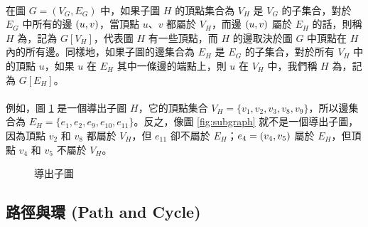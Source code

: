 \documentclass[12pt,a4paper,oneside]{report}
\begin{document}
\begin{CJK}{UTF8}{bkai}
\paragraph{}在圖 $G=(V_G, E_G)$ 中，如果子圖 $H$ 的頂點集合為 $V_H$ 是 $V_G$ 的子集合，對於 $E_G$ 中所有的邊 $({u},{v})$，當頂點 $u$、$v$ 都屬於 $V_H$，而邊 $({u},{v})$ 屬於 $E_H$ 的話，則稱 $H$ 為\textbf{}，記為 $G[V_H]$，代表圖 $H$ 有一些頂點，而 $H$ 的邊取決於圖 $G$ 中頂點在 $H$ 內的所有邊。同樣地，如果子圖的邊集合為 $E_H$ 是 $E_G$ 的子集合，對於所有 $V_H$ 中的頂點 $u$，如果 $u$ 在 $E_H$ 其中一條邊的端點上，則 $u$ 在 $V_H$ 中，我們稱 $H$ 為，記為 $G[E_H]$。
\paragraph{}例如，圖 \ref{fig:subgraph_induced} 是一個導出子圖 $H$，它的頂點集合 $V_H=\{{v_1,v_2,v_3,v_8,v_9}\}$，所以邊集合為 $E_H=\{{e_1,e_2,e_9,e_{10},e_{11}}\}$。反之，像圖 \ref{fig:subgraph} 就不是一個導出子圖，因為頂點 $v_2$ 和 $v_8$ 都屬於 $V_H$，但 $e_{11}$ 卻不屬於 $E_H$；$e_4=({v_4},{v_5})$ 屬於 $E_H$，但頂點 $v_4$ 和 $v_5$ 不屬於 $V_H$。
\begin{figure}[h!]
\centering
{}
\caption{導出子圖}
\label{fig:subgraph_induced}
\end{figure}

\subsection{路徑與環 (Path and Cycle)}

\end{CJK}
\end{document}

